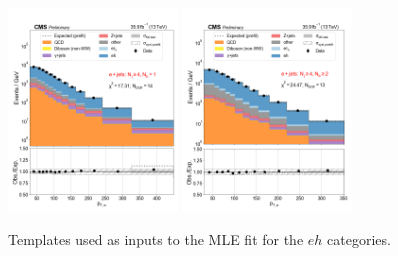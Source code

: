 \begin{figure}[htb!]
    \centering
    \includegraphics[width=0.4\textwidth]{chapters/Analysis/sectionStatisticalAnalysis/figures/fit/ejet_cat_gt4_eq1}
    \includegraphics[width=0.4\textwidth]{chapters/Analysis/sectionStatisticalAnalysis/figures/fit/ejet_cat_gt4_gt2}
    \caption{Templates used as inputs to the MLE fit for the $eh$ categories.}
    \label{fig:mle_templates_e4j}
\end{figure}

